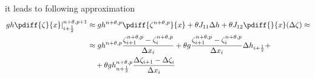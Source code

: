 it leads to following approximation
\begin{align}
    \left.gh \pdiff{\zeta}{x}\right|^{n+\theta, p+1}_{i+\half} & \approx g h^{n+\theta, p} \pdiff{\zeta^{n+\theta, p}}{x}  + \theta J_{11}\Delta h  + \theta J_{12} \pdiff{}{x}(\Delta \zeta) \approx
    \\
    & \approx g h^{n+\theta, p} \frac{\zeta^{n+\theta, p}_{i+1} - \zeta^{n+\theta, p}_{i}}{\Dx_{i}}
    + \theta g \frac{\zeta^{n+\theta, p}_{i+1} - \zeta^{n+\theta, p}_{i}}{\Dx_{i}} \Delta h_{i+\half} +
    \\
    & \quad + \theta gh^{n+\theta, p}_{n+\half} \frac{\Delta \zeta_{i+1} - \Delta \zeta_{i}}{\Dx_{i}}
\end{align}
